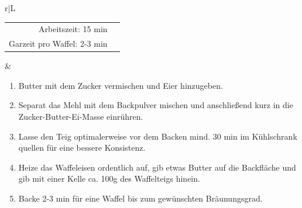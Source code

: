 \documentclass[a4paper, 12pt]{scrbook} 								%
\numberwithin{equation}{section} 									%
\begin{document}
\begin{tabularx}{\textwidth}{r|L}
\begin{tabular}[t]{rr}
				Arbeitszeit: 15 min	\\
				Garzeit pro Waffel: 2-3 min	\\
			\end{tabular}			&	\begin{enumerate}[]
											\item Butter mit dem Zucker vermischen und Eier hinzugeben.
											\item Separat das Mehl mit dem Backpulver mischen und anschließend kurz in die Zucker-Butter-Ei-Masse einrühren.
											\item Lasse den Teig optimalerweise vor dem Backen mind. 30 min im Kühlschrank quellen für eine bessere Konsistenz.
											\item Heize das Waffeleisen ordentlich auf, gib etwas Butter auf die Backfläche und gib mit einer Kelle ca. 100g des Waffelteigs hinein.
											\item Backe 2-3 min für eine Waffel bis zum gewünschten Bräunungsgrad.
										\end{enumerate}	\\
		\end{tabularx}
		\newpage


\end{document}
